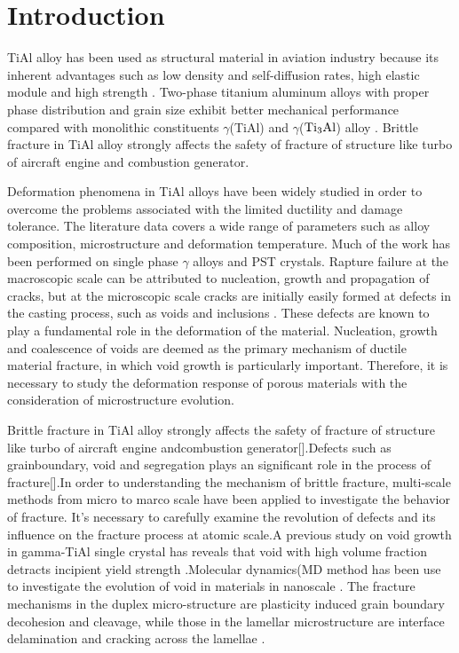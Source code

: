 \documentclass[journal,article,submit,moreauthors,pdftex,10pt,a4paper]{Definitions/mdpi}
\begin{document}


\section{Introduction}
TiAl alloy has been used as structural material in aviation industry because its inherent advantages such as low density and self-diffusion rates, high elastic module and high strength \cite{vu2013}. Two-phase titanium aluminum alloys with proper phase distribution and grain size exhibit better mechanical performance compared with monolithic constituents $\gamma$(TiAl) and $\gamma$($\rm Ti_3Al$) alloy \cite{Kim1995}. Brittle fracture in TiAl alloy strongly affects the safety of fracture of structure like turbo of aircraft engine and combustion generator. 

Deformation phenomena in TiAl alloys have been widely studied in order to overcome the problems associated with the limited ductility and damage tolerance. The literature data covers a wide range of parameters such as alloy composition, microstructure and deformation temperature. Much of the work has been performed on single phase $\gamma$ alloys and PST crystals. 
Rapture failure at the macroscopic scale can be attributed to nucleation, growth and propagation of cracks, but at the microscopic scale cracks are initially easily formed at defects in the casting process, such as voids and inclusions \cite{}. These defects are known to play a fundamental role in the deformation of the material. Nucleation, growth and coalescence of voids are deemed as the primary mechanism of ductile material fracture, in which void growth is particularly important. Therefore, it is necessary to study the deformation response of porous materials with the consideration of microstructure evolution.

Brittle fracture in TiAl alloy strongly affects the safety of fracture of structure like turbo of aircraft engine andcombustion generator[].Defects such as grainboundary, void and segregation plays an significant role in the process of fracture[].In order to understanding the mechanism of brittle fracture, multi-scale methods from micro to marco scale have been applied to investigate the behavior of fracture. It's necessary to carefully examine the revolution of defects and its influence on the fracture process at atomic scale.A previous study on void growth in gamma-TiAl single crystal has reveals that void with high volume fraction detracts incipient yield strength \cite{}.Molecular dynamics(MD method has been use to investigate the evolution of void in materials in nanoscale \cite{}. The fracture mechanisms in the duplex micro-structure are plasticity induced grain boundary decohesion and cleavage, while those in the lamellar microstructure are interface delamination and cracking across the lamellae \cite{}.
\end{document}

